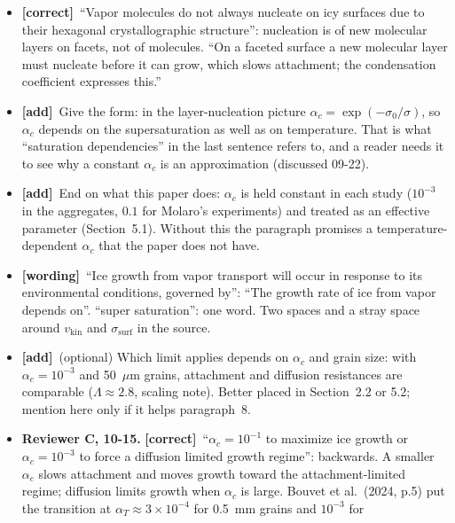 \documentclass[11pt]{article}
\newcommand{\tC}{\textcolor{miss}{\textbf{[correct]}}\ }
\newcommand{\tG}{\textcolor{stale}{\textbf{[wording]}}\ }
\newcommand{\tA}{\textcolor{have}{\textbf{[add]}}\ }
\newcommand{\add}[1]{\textcolor{revX}{#1}}
\providecommand{\alphaC}{\alpha_c}
\begin{document}
\begin{enumerate}
\begin{itemize}
  \item \tC ``Vapor molecules do not always nucleate on icy surfaces due to
    their hexagonal crystallographic structure'': nucleation is of new
    molecular layers on facets, not of molecules. ``On a faceted surface a
    new molecular layer must nucleate before it can grow, which slows
    attachment; the condensation coefficient expresses this.''
  \item \tA Give the form: in the layer-nucleation picture $\alpha_c =
    \exp(-\sigma_0/\sigma)$, so $\alpha_c$ depends on the supersaturation as
    well as on temperature. That is what ``saturation dependencies'' in the
    last sentence refers to, and a reader needs it to see why a constant
    $\alpha_c$ is an approximation (discussed 09-22).
  \item \tA End on what this paper does: $\alpha_c$ is held constant in each
    study ($10^{-3}$ in the aggregates, $0.1$ for Molaro's experiments) and
    treated as an effective parameter (Section~5.1). Without this the
    paragraph promises a temperature-dependent $\alpha_c$ that the paper does
    not have.
  \item \tG ``Ice growth from vapor transport will occur in response to its
    environmental conditions, governed by'': ``The growth rate of ice from
    vapor depends on''. ``super saturation'': one word. Two spaces and a
    stray space around $v_{\mathrm{kin}}$ and $\sigma_{\mathrm{surf}}$ in the
    source.
  \item \tA (optional) Which limit applies depends on $\alpha_c$ and grain
    size: with $\alpha_c = 10^{-3}$ and 50~$\mu$m grains, attachment and
    diffusion resistances are comparable ($\Lambda \approx 2.8$, scaling
    note). Better placed in Section~2.2 or 5.2; mention here only if it
    helps paragraph~8.
  \item \add{\textbf{Reviewer C, 10-15.} \tC ``$\alphaC=10^{-1}$ to maximize
    ice growth or $\alphaC=10^{-3}$ to force a diffusion limited growth
    regime'': backwards. A smaller $\alpha_c$ slows attachment and moves
    growth toward the attachment-limited regime; diffusion limits growth
    when $\alpha_c$ is large. Bouvet et al.\ (2024, p.5) put the transition
    at $\alpha_T \approx 3\times10^{-4}$ for 0.5~mm grains and $10^{-3}$ for
}
\end{itemize}
\end{enumerate}
\end{document}
